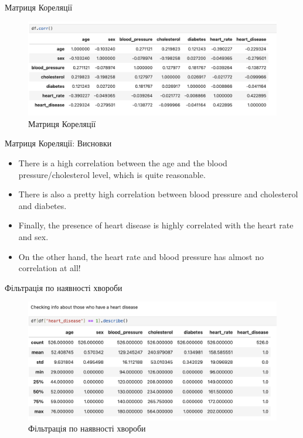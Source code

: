 \documentclass{beamer}
\begin{document}
    \begin{frame}{Матриця Кореляції}
        \begin{figure}
            \centering
            \includegraphics[width=\textwidth]{images/correlation_matrix.png}
            \caption{Матриця Кореляції}
        \end{figure}
    \end{frame}

    \begin{frame}{Матриця Кореляції: Висновки}
        \begin{itemize}
            \item There is a high correlation between the age and the blood pressure/cholesterol level, which is quite reasonable.
            \item There is also a pretty high correlation between blood pressure and cholesterol and diabetes.
            \item Finally, the presence of heart disease is highly correlated with the heart rate and sex.
            \item On the other hand, the heart rate and blood pressure has almost no correlation at all!
        \end{itemize}
    \end{frame}

    \begin{frame}{Фільтрація по наявності хвороби}
        \begin{figure}
            \centering
            \includegraphics[width=\textwidth]{images/with_describe.png}
            \caption{Фільтрація по наявності хвороби}
        \end{figure}
    \end{frame}
\end{document}
